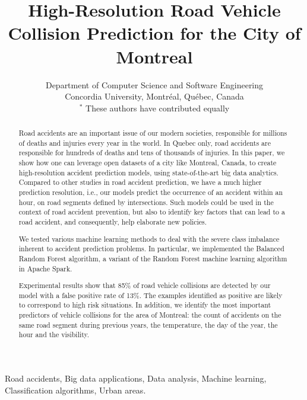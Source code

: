 \documentclass[conference]{IEEEtran}
\begin{document}
\title{High-Resolution Road Vehicle Collision Prediction for the City of Montreal}
\author{
Department of Computer Science and Software Engineering \\
Concordia University, Montréal, Québec, Canada\\
$^*$ These authors have contributed equally

}

\maketitle

\begin{abstract}

Road accidents are an important issue of our modern societies, responsible
for millions of deaths and injuries every year in the world. In Quebec only,
road accidents are responsible for hundreds of deaths and tens of thousands of injuries. 
In this paper, we show how one can leverage open datasets of a city like
Montreal, Canada, to create high-resolution accident prediction models, using state-of-the-art
big data analytics.
Compared to other studies in road accident prediction, we have a much higher
prediction resolution, i.e., our models predict the occurrence of an accident
within an hour, on road segments defined by intersections.
Such models could be used in the context of road accident prevention, but also
to identify key factors that can lead to a road accident, and consequently, help
elaborate new policies.

We tested various machine learning methods to deal with the severe class imbalance inherent
to accident prediction problems. In particular, we implemented the Balanced Random Forest algorithm, a variant
of the Random Forest machine learning algorithm in Apache Spark.

Experimental results show that 85\% of road vehicle collisions are detected by our model with a false positive rate of 13\%. The examples identified as positive are likely to correspond to high risk situations.
In addition, we identify the most important predictors of vehicle collisions for the area of Montreal: the count of accidents on the same road segment during previous years, the temperature, the day of the year, the hour and the visibility.

\end{abstract}

\begin{IEEEkeywords}
Road accidents, Big data applications, Data analysis, Machine learning, Classification algorithms, Urban areas. 
\end{IEEEkeywords}
\end{document}
